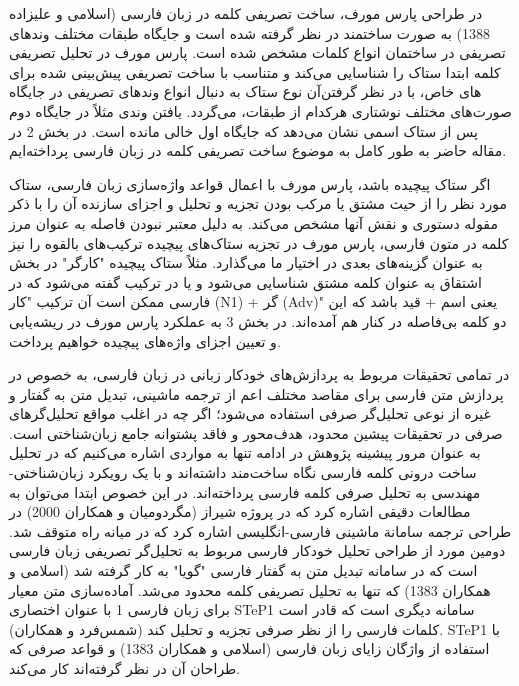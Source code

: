 \documentclass[12pt,onecolumn,a4paper]{article}
\begin{document}
    \par\noindent
    در طراحی پارس مورف، ساخت تصریفی کلمه در زبان فارسی (اسلامی و علیزاده 1388) به صورت ساختمند در نظر گرفته شده است و جایگاه طبقات مختلف وندهای تصریفی در ساختمان انواع کلمات مشخص شده است. پارس مورف در تحلیل تصریفی کلمه ابتدا ستاک را شناسایی می‌کند و متناسب با ساخت تصریفی پیش‌بینی شده برای آن نوع ستاک به دنبال انواع وندهای تصریفی در جایگاه‎‌های خاص، با در نظر گرفتن صورت‌های مختلف نوشتاری هرکدام از طبقات، می‌گردد. یافتن وندی مثلاً در جایگاه دوم پس از ستاک اسمی نشان می‌دهد که جایگاه اول خالی مانده است. در بخش 2 در مقاله حاضر به طور کامل به موضوع ساخت تصریفی کلمه در زبان فارسی پرداخته‌ایم.
    \par\noindent
    اگر ستاک پیچیده باشد، پارس مورف با اعمال قواعد واژه‌سازی زبان فارسی، ستاک مورد نظر را از حیث مشتق یا مرکب بودن تجزیه و تحلیل و اجزای سازنده آن را با ذکر مقوله دستوری و نقش آنها مشخص می‌کند. به دلیل معتبر نبودن فاصله به عنوان مرز کلمه در متون فارسی، پارس مورف در تجزیه ستاک‌های پیچیده ترکیب‌های بالقوه را نیز به عنوان گزینه‌های بعدی در اختیار ما می‌گذارد. مثلاً ستاک پیچیده "کارگر" در بخش اشتقاق به عنوان کلمه مشتق شناسایی می‌شود و یا در ترکیب گفته می‌شود که در فارسی ممکن است آن ترکیب "کار (N1) + گر (Adv)" یعنی اسم + قید باشد که این دو کلمه بی‌فاصله در کنار هم آمده‌اند. در بخش 3 به عملکرد پارس مورف در ریشه‌یابی و تعیین اجزای واژه‌های پیچیده خواهیم پرداخت.
    \par\noindent
    در تمامی تحقیقات مربوط به پردازش‌های خودکار زبانی در زبان فارسی، به خصوص در پردازش متن فارسی برای مقاصد مختلف اعم از ترجمه ماشینی، تبدیل متن به گفتار و غیره از نوعی تحلیل‌گر صرفی استفاده می‌شود؛ اگر چه در اغلب مواقع تحلیل‌گرهای صرفی در تحقیقات پیشین محدود، هدف‌محور و فاقد پشتوانه جامع زبان‌شناختی است. به عنوان مرور پیشینه پژوهش در ادامه تنها به مواردی اشاره می‌کنیم که در تحلیل ساخت درونی کلمه فارسی نگاه ساخت‌مند داشته‌اند و با یک رویکرد زبان‌شناختی- مهندسی به تحلیل صرفی کلمه فارسی پرداخته‌اند. در این خصوص ابتدا می‌توان به مطالعات دقیقی اشاره کرد که در پروژه شیراز (مگردومیان و همکاران 2000) در طراحی ترجمه سامانة ماشینی فارسی-انگلیسی اشاره کرد که در میانه راه متوقف شد. دومین مورد از طراحی تحلیل خودکار فارسی مربوط به تحلیل‌گر تصریفی زبان فارسی است که در سامانه تبدیل متن به گفتار فارسی "گویا" به کار گرفته شد (اسلامی و همکاران 1383) که تنها به تحلیل تصریفی کلمه محدود می‌شد. آماده‌سازی متن معیار برای زبان فارسی 1 با عنوان اختصاری STeP1 سامانه دیگری است که قادر است کلمات فارسی را از نظر صرفی تجزیه و تحلیل کند (شمس‌فرد و همکاران). STeP1 با استفاده از واژگان زایای زبان فارسی (اسلامی و همکاران 1383) و قواعد صرفی که طراحان آن در نظر گرفته‌اند کار می‌کند.
    \par\noindent
\end{document}
